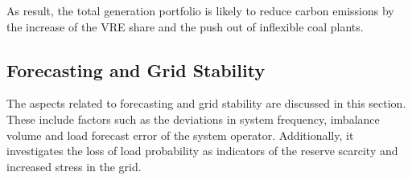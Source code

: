 \documentclass[energies,article,submit,moreauthors,pdftex]{Definitions/mdpi}
\begin{document}
As result, the total generation portfolio is likely to reduce carbon emissions by the increase of the VRE share and the push out of inflexible coal plants.



\subsection{Forecasting and Grid Stability}
The aspects related to forecasting and grid stability are discussed in this section. These include factors such as the deviations in system frequency, imbalance volume and load forecast error of the system operator. Additionally, it investigates the loss of load probability as indicators of the reserve scarcity and increased stress in the grid.
\end{document}
